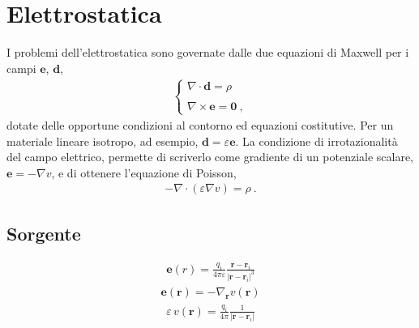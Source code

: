 \documentclass[letterpaper,10pt,english]{jupyterBook}
\begin{document}
\section{Elettrostatica}
\label{\detokenize{ch/numerical-methods:elettrostatica}}
\sphinxAtStartPar
I problemi dell’elettrostatica sono governate dalle due equazioni di Maxwell per i campi \(\mathbf{e}\), \(\mathbf{d}\),
\begin{equation*}
\begin{split}\begin{cases}
  \nabla \cdot \mathbf{d} = \rho \\ \\
  \nabla \times \mathbf{e} = \mathbf{0 \ ,}
\end{cases}\end{split}
\end{equation*}
\sphinxAtStartPar
dotate delle opportune condizioni al contorno ed equazioni costitutive. Per un materiale lineare isotropo, ad esempio, \(\mathbf{d} = \varepsilon \mathbf{e}\). La condizione di irrotazionalità del campo elettrico, permette di scriverlo come gradiente di un potenziale scalare, \(\mathbf{e} = - \nabla v\), e di ottenere l’equazione di Poisson,
\begin{equation*}
\begin{split}-\nabla \cdot (\varepsilon \nabla v ) = \rho \ .\end{split}
\end{equation*}

\subsection{Sorgente}
\label{\detokenize{ch/numerical-methods:sorgente}}\begin{equation*}
\begin{split}\mathbf{e}(r) = \frac{q_i}{4 \pi \varepsilon}\frac{\mathbf{r} - \mathbf{r}_i}{|\mathbf{r} - \mathbf{r}_i|^3}\end{split}
\end{equation*}\begin{equation*}
\begin{split}\mathbf{e}(\mathbf{r}) = - \nabla_{\mathbf{r}} v(\mathbf{r})\end{split}
\end{equation*}\begin{equation*}
\begin{split}\varepsilon \, v(\mathbf{r}) = \frac{q_i}{4 \pi}\frac{1}{|\mathbf{r} - \mathbf{r}_i|}\end{split}
\end{equation*}
\end{document}
